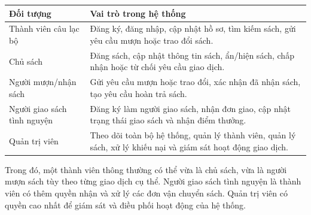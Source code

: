 \begin{tabularx}{\textwidth}{L{0.32\textwidth}Y}
    \toprule
    \textbf{Đối tượng} & \textbf{Vai trò trong hệ thống} \\
    \midrule
    Thành viên câu lạc bộ & Đăng ký, đăng nhập, cập nhật hồ sơ, tìm kiếm sách, gửi yêu cầu mượn hoặc trao đổi sách. \\
    \midrule
    Chủ sách & Đăng sách, cập nhật thông tin sách, ẩn/hiện sách, chấp nhận hoặc từ chối yêu cầu giao dịch. \\
    \midrule
    Người mượn/nhận sách & Gửi yêu cầu mượn hoặc trao đổi, xác nhận đã nhận sách, tạo yêu cầu hoàn trả sách. \\
    \midrule
    Người giao sách tình nguyện & Đăng ký làm người giao sách, nhận đơn giao, cập nhật trạng thái giao sách và nhận điểm thưởng. \\
    \midrule
    Quản trị viên & Theo dõi toàn bộ hệ thống, quản lý thành viên, quản lý sách, xử lý khiếu nại và giám sát hoạt động giao dịch. \\
    \bottomrule
\end{tabularx}

Trong đó, một thành viên thông thường có thể vừa là chủ sách, vừa là người mượn sách tùy theo từng giao dịch cụ thể. Người giao sách tình nguyện là thành viên có thêm quyền nhận và xử lý các đơn vận chuyển sách. Quản trị viên có quyền cao nhất để giám sát và điều phối hoạt động của hệ thống.
